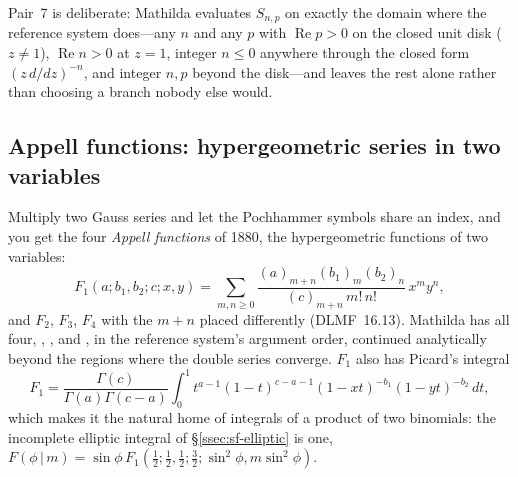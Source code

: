Pair~7 is deliberate: Mathilda evaluates \(S_{n,p}\) on exactly the domain where the
reference system does---any \(n\) and any \(p\) with \(\operatorname{Re}p>0\) on the closed unit disk (\(z\ne1\)), \(\operatorname{Re}n>0\)
at \(z=1\), integer \(n\le0\) anywhere through the closed form \((z\,d/dz)^{-n}\), and
integer \(n,p\) beyond the disk---and leaves the rest alone rather than choosing a branch
nobody else would.

\subsection{Appell functions: hypergeometric series in two variables}
\label{ssec:sf-appell}

Multiply two Gauss series and let the Pochhammer symbols share an index, and you get the
four \emph{Appell functions} of 1880, the hypergeometric functions of two variables:
\[
  F_1(a;b_1,b_2;c;x,y)=\sum_{m,n\ge0}\frac{(a)_{m+n}(b_1)_m(b_2)_n}{(c)_{m+n}\,m!\,n!}\,x^my^n,
\]
and \(F_2\), \(F_3\), \(F_4\) with the \(m+n\) placed differently (DLMF~16.13). Mathilda
has all four, , ,
 and , in the reference
system's argument order, continued analytically beyond the regions where the double
series converge. \(F_1\) also has Picard's integral
\[
  F_1=\frac{\Gamma(c)}{\Gamma(a)\Gamma(c-a)}\int_0^1
  t^{a-1}(1-t)^{c-a-1}(1-xt)^{-b_1}(1-yt)^{-b_2}\,dt,
\]
which makes it the natural home of integrals of a product of two binomials: the
incomplete elliptic integral of \S\ref{ssec:sf-elliptic} is one,
\(F(\phi\,|\,m)=\sin\phi\,F_1(\tfrac12;\tfrac12,\tfrac12;\tfrac32;\sin^2\phi,m\sin^2\phi)\).

